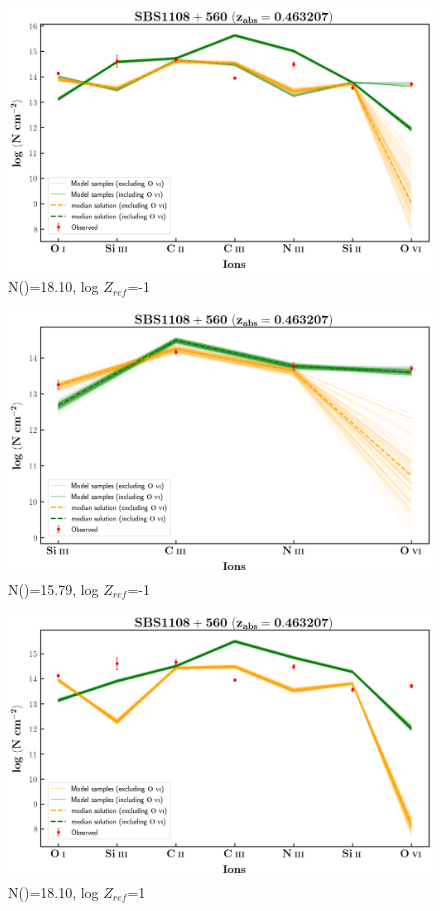 \documentclass[12pt,draft]{report}
\newcommand\ion[2]{\text{#1\,\textsc{\lowercase{#2}}}}
\begin{document}
\begin{figure}[!h]
    \centering
    \includegraphics[width=0.85\linewidth]{Ionisation-Modelling-Plots/sbs1108-z=0.463207-compIII_logZ=-1.png}
    \caption{N(\ion{H}{i})=18.10, log $Z_{ref}$=-1}
\end{figure}


\begin{figure}[!b]
    \centering
    \includegraphics[width=0.85\linewidth]{Ionisation-Modelling-Plots/sbs1108-z=0.463207-compII_logZ=-1.png}
    \caption{N(\ion{H}{i})=15.79, log $Z_{ref}$=-1}
\end{figure}

\newpage

\begin{figure}[!h]
    \centering
    \includegraphics[width=0.85\linewidth]{Ionisation-Modelling-Plots/sbs1108-z=0.463207-compIII_logZ=1.png}
    \caption{N(\ion{H}{i})=18.10, log $Z_{ref}$=1}
\end{figure}
\end{document}
